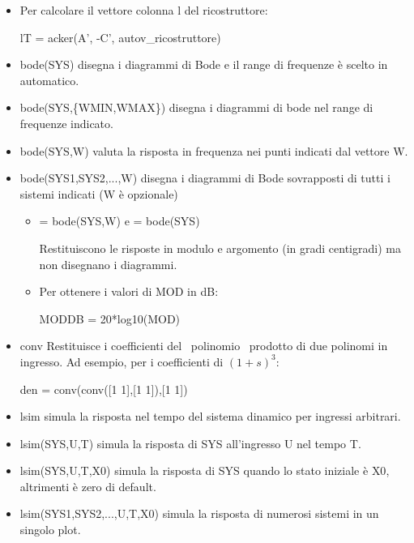 \documentclass[10pt,a4paper]{book}
\begin{document}
\begin{itemize}
	      {\selectfont k = acker(A, -B, autov\_controllore);}
	\item Per calcolare il vettore colonna {\selectfont l} del ricostruttore:
	      
	      {\selectfont lT = acker(A', -C', autov\_ricostruttore)}

	\item {\selectfont bode(SYS)} disegna i diagrammi di Bode e il range di frequenze è scelto in automatico.
	\item {\selectfont bode(SYS,\{WMIN,WMAX\})} disegna i diagrammi di bode nel range di frequenze indicato.
	\item {\selectfont bode(SYS,W)} valuta la risposta in frequenza nei punti indicati dal vettore {\selectfont W}.
	\item {\selectfont bode(SYS1,SYS2,...,W)} disegna i diagrammi di Bode sovrapposti di tutti i sistemi indicati ({\selectfont W} è opzionale)
	      \begin{itemize}
	      	
	      	Chiamate:
	      	\item { = bode(SYS,W)} e { = bode(SYS)}
	      	      
	      	      Restituiscono le risposte in modulo e argomento (in gradi centigradi) ma non disegnano i diagrammi.
	      	\item Per ottenere i valori di MOD in dB:
	      	      
	      	      {\selectfont MODDB = 20*log10(MOD)}
	      \end{itemize}

	\item {\selectfont conv} Restituisce i coefficienti del \ polinomio \ prodotto di due polinomi in ingresso. Ad esempio, per i coefficienti di $(1+s)^3$:
	      
	      {\selectfont den = conv(conv([1 1],[1 1]),[1 1])}

	\item {\selectfont lsim} simula la risposta nel tempo del sistema dinamico per ingressi arbitrari.
	\item {\selectfont lsim(SYS,U,T)} simula la risposta di {\selectfont SYS} all’ingresso {\selectfont U} nel tempo {\selectfont T}.
	\item {\selectfont lsim(SYS,U,T,X0)} simula la risposta di {\selectfont SYS} quando lo stato iniziale è {\selectfont X0}, altrimenti è zero di default.
	\item {\selectfont lsim(SYS1,SYS2,...,U,T,X0)} simula la risposta di numerosi sistemi in un singolo plot.
	      \begin{itemize}
	      	

\end{itemize}
\end{itemize}
\end{document}
